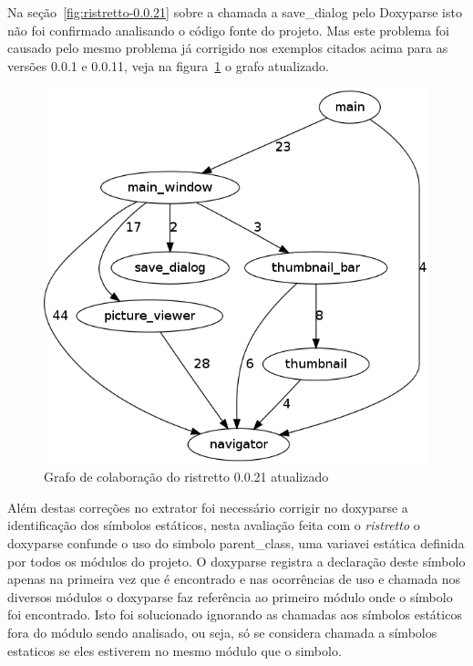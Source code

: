 Na seção~\ref{fig:ristretto-0.0.21} sobre a chamada a save\_dialog pelo
Doxyparse isto não foi confirmado analisando o código fonte do projeto.  Mas
este problema foi causado pelo mesmo problema já corrigido nos exemplos citados
acima para as versões 0.0.1 e 0.0.11, veja na
figura~\ref{fig:ristretto-0.0.21-doxyparse-2} o grafo atualizado.

\begin{figure}
\center
\includegraphics[scale=0.3]{imagens/ristretto-0_0_21-doxyparse-2}
\caption{Grafo de colaboração do ristretto 0.0.21 atualizado}
\label{fig:ristretto-0.0.21-doxyparse-2}
\end{figure}

Além destas correções no extrator foi necessário corrigir no doxyparse a
identificação dos símbolos estáticos, nesta avaliação feita com o {\it
ristretto} o doxyparse confunde o uso do simbolo parent\_class, uma variavei
estática definida por todos os módulos do projeto. O doxyparse registra a
declaração deste símbolo apenas na primeira vez que é encontrado e nas
ocorrências de uso e chamada nos diversos módulos o doxyparse faz referência ao
primeiro módulo onde o símbolo foi encontrado. Isto foi solucionado ignorando
as chamadas aos símbolos estáticos fora do módulo sendo analisado, ou seja, só
se considera chamada a símbolos estaticos se eles estiverem no mesmo módulo que
o simbolo.


